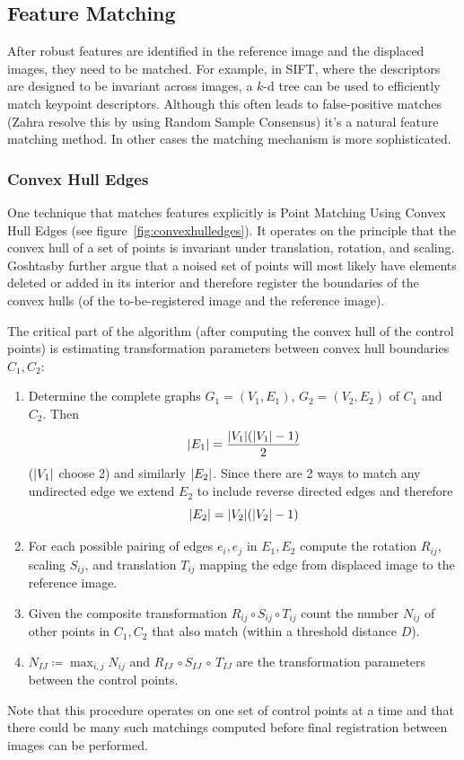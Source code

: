 \subsection{Feature Matching}

After robust features are identified in the reference image and the displaced images, they need to be matched.
%
For example, in SIFT, where the descriptors are designed to be invariant across images, a \(k\)-d tree can be used to efficiently match keypoint descriptors.
%
Although this often leads to false-positive matches (Zahra \etal resolve this by using Random Sample Consensus) it's a natural feature matching method.
%
In other cases the matching mechanism is more sophisticated.

\subsubsection{Convex Hull Edges}
%
One technique that matches features explicitly is Point Matching Using Convex Hull Edges \cite{Goshtasby1985} (see figure~\ref{fig:convexhulledges}).
%
It operates on the principle that the convex hull of a set of points is invariant under translation, rotation, and scaling.
%
Goshtasby \etal further argue that a noised set of points will most likely have elements deleted or added in its interior and therefore register the boundaries of the convex hulls (of the to-be-registered image and the reference image).
%

The critical part of the algorithm (after computing the convex hull of the control points) is estimating transformation parameters between convex hull boundaries \(C_1, C_2\):
%
\begin{mdframed}
	\begin{enumerate}
		\item Determine the complete graphs \(G_1=(V_1, E_1)\), \(G_2 = (V_2,E_2)\) of \(C_1\) and \(C_2\). Then \[\abs{E_1} = \frac{\abs{V_1} (\abs{V_1}-1)}{2}\] (\(\abs{V_1}\) choose 2) and similarly \(\abs{E_2}\). Since there are 2 ways to match any undirected edge we extend \(E_2\) to include reverse directed edges and therefore \[\abs{E_2} = \abs{V_2} (\abs{V_2}-1)\]
		\item For each possible pairing of edges \(e_i, e_j\) in \(E_1, E_2\) compute the rotation \(R_{ij}\), scaling \(S_{ij}\), and translation \(T_{ij}\) mapping the edge from displaced image to the reference image.
		\item Given the composite transformation \(R_{ij} \circ S_{ij} \circ T_{ij}\) count the number \(N_{ij}\) of other points in \(C_1, C_2\) that also match (within a threshold distance \(D\)).
		\item \(N_{IJ} \coloneqq \max_{i,j} N_{ij}\) and \(R_{IJ}\, \circ S_{IJ}\, \circ\, T_{IJ}\) are the transformation parameters between the control points.
	\end{enumerate}
\end{mdframed}
%
Note that this procedure operates on one set of control points at a time and that there could be many such matchings computed before final registration between images can be performed.

